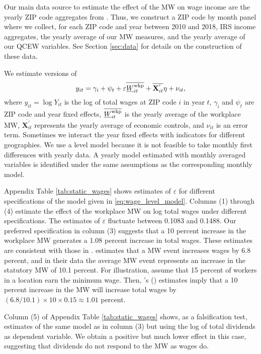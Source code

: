 Our main data source to estimate the effect of the MW on wage income are
the yearly ZIP code aggregates from \textcite{IRS}.
Thus, we construct a ZIP code by month panel where we collect, for each ZIP code
and year between 2010 and 2018, IRS income aggregates, the yearly average of our 
MW measures, and the yearly average of our QCEW variables. 
See Section \ref{sec:data} for details on the construction of these data.

We estimate versions of
\begin{equation*}\label{eq:wage_level_model}
    y_{it} = \gamma_i + \psi_t + \varepsilon \overline{\underline{W}_{it}^{\text{wkp}}} + 
                 \overline{\mathbf{X}^{'}_{it}}\eta + \nu_{it} ,
\end{equation*}
where 
$y_{it} = \log Y_{it}$ is the log of total wages at ZIP code $i$ in year $t$,
$\gamma_i$ and $\psi_t$ are ZIP code and year fixed effects,
$\overline{\underline{W}_{it}^{\text{wkp}}}$ is the yearly average of the workplace MW,
$\overline{\mathbf{X}^{'}_{it}}$ represents the yearly average of economic 
controls, and
$\nu_{it}$ is an error term.
Sometimes we interact the year fixed effects with indicators for different
geographies.
We use a level model because it is not feasible to take monthly first differences 
with yearly data.
A yearly model estimated with monthly averaged variables is identified under the 
same assumptions as the corresponding monthly model.

Appendix Table \ref{tab:static_wages} shows estimates of $\varepsilon$ for 
different specifications of the model given in \eqref{eq:wage_level_model}.
Columns (1) through (4) estimate the effect of the workplace MW on log total
wages under different specifications.
The estimates of $\varepsilon$ fluctuate between 0.1083 and 0.1488.
Our preferred specification in column (3) suggests that a 10 percent increase
in the workplace MW generates a 1.08 percent increase in total wages.
These estimates are consistent with those in \textcite{CegnizEtAl2019}.
\textcite[][Table I]{CegnizEtAl2019} estimates that a MW event increases wages
by 6.8 percent, and in their data the average MW event represents an increase in 
the statutory MW of 10.1 percent.
For illustration, assume that 15 percent of workers in a location earn the
minimum wage.
Then, \citeauthor{CegnizEtAl2019}'s (\citeyear{CegnizEtAl2019}) estimates imply 
that a 10 percent increase in the MW will increase total wages by 
$(6.8/10.1)\times 10\times 0.15 \approx 1.01$ percent.

Column (5) of Appendix Table \ref{tab:static_wages} shows, as a falsification
test, estimates of the same model as in column (3) but using the log of total
dividends as dependent variable.
We obtain a positive but much lower effect in this case, suggesting that 
dividends do not respond to the MW as wages do.
